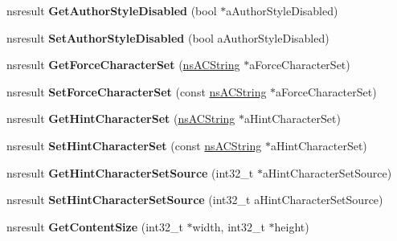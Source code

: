 \begin{DoxyCompactItemize}
nsresult {\bfseries Get\+Author\+Style\+Disabled} (bool $\ast$a\+Author\+Style\+Disabled)
\item 
\mbox{\label{interfacens_i_content_viewer_adf775775898182609c246b903dab842b}} 
nsresult {\bfseries Set\+Author\+Style\+Disabled} (bool a\+Author\+Style\+Disabled)
\item 
\mbox{\label{interfacens_i_content_viewer_a9c26821b57606c6361bdcddcc58d658c}} 
nsresult {\bfseries Get\+Force\+Character\+Set} (\hyperlink{structns_c_string_container}{ns\+A\+C\+String} $\ast$a\+Force\+Character\+Set)
\item 
\mbox{\label{interfacens_i_content_viewer_a3903a7f54c71253f62d75c934a98758d}} 
nsresult {\bfseries Set\+Force\+Character\+Set} (const \hyperlink{structns_c_string_container}{ns\+A\+C\+String} $\ast$a\+Force\+Character\+Set)
\item 
\mbox{\label{interfacens_i_content_viewer_af2e1f8fdf3bd42616ccc52563f2691f8}} 
nsresult {\bfseries Get\+Hint\+Character\+Set} (\hyperlink{structns_c_string_container}{ns\+A\+C\+String} $\ast$a\+Hint\+Character\+Set)
\item 
\mbox{\label{interfacens_i_content_viewer_a3a9f8725a492296062bd20e287ba6027}} 
nsresult {\bfseries Set\+Hint\+Character\+Set} (const \hyperlink{structns_c_string_container}{ns\+A\+C\+String} $\ast$a\+Hint\+Character\+Set)
\item 
\mbox{\label{interfacens_i_content_viewer_a96b5bb422c0eec0e52544b8655347187}} 
nsresult {\bfseries Get\+Hint\+Character\+Set\+Source} (int32\+\_\+t $\ast$a\+Hint\+Character\+Set\+Source)
\item 
\mbox{\label{interfacens_i_content_viewer_a25e12bc362236538ce61c11cc91e8c94}} 
nsresult {\bfseries Set\+Hint\+Character\+Set\+Source} (int32\+\_\+t a\+Hint\+Character\+Set\+Source)
\item 
\mbox{\label{interfacens_i_content_viewer_afe255192ce08bde4220bc0bf16ce46e9}} 
nsresult {\bfseries Get\+Content\+Size} (int32\+\_\+t $\ast$width, int32\+\_\+t $\ast$height)

\end{DoxyCompactItemize}
